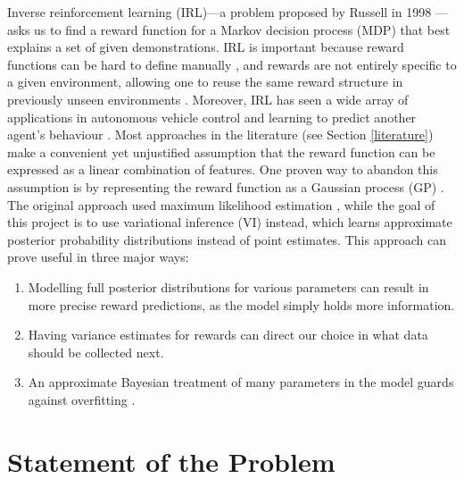 \documentclass{mprop}
\theoremstyle{definition}
\begin{document}
Inverse reinforcement learning (IRL)---a problem proposed by Russell in
1998 \cite{DBLP:conf/colt/Russell98}---asks us to find a reward function for a
Markov decision process (MDP) that best explains a set of given demonstrations.
IRL is important because reward functions can be hard to define manually
\cite{DBLP:conf/icml/PieterN04,DBLP:journals/corr/abs-1806-06877}, and rewards
are not entirely specific to a given environment, allowing one to reuse the same
reward structure in previously unseen environments
\cite{DBLP:journals/corr/abs-1806-06877,DBLP:conf/uai/JinDAS17,DBLP:conf/nips/LevinePK11}.
Moreover, IRL has seen a wide array of applications in autonomous vehicle
control \cite{DBLP:journals/ijsr/KimP16,DBLP:journals/ijrr/KretzschmarSSB16} and
learning to predict another agent's behaviour
\cite{DBLP:journals/ai/BogertD18,DBLP:conf/aaai/VogelRGR12,ziebart2008maximum,DBLP:conf/huc/ZiebartMDB08,DBLP:conf/iros/ZiebartRGMPBHDS09}.
Most approaches in the literature (see Section \ref{literature}) make a
convenient yet unjustified assumption that the reward function can be expressed
as a linear combination of features. One proven way to abandon this assumption
is by representing the reward function as a Gaussian process (GP)
\cite{DBLP:conf/uai/JinDAS17,DBLP:conf/nips/LevinePK11,DBLP:journals/corr/abs-1208-2112}.
The original approach used maximum likelihood estimation
\cite{DBLP:conf/nips/LevinePK11}, while the goal of this project is to use
variational inference (VI) instead, which learns approximate posterior
probability distributions instead of point estimates. This approach can prove
useful in three major ways:
\begin{enumerate}
\item Modelling full posterior distributions for various parameters can result
  in more precise reward predictions, as the model simply holds more
  information.
\item Having variance estimates for rewards can direct our choice in what data
  should be collected next.
\item An approximate Bayesian treatment of many parameters in the model guards
  against overfitting \cite{DBLP:conf/uai/JinDAS17}.
\end{enumerate}

\section{Statement of the Problem}
\end{document}
